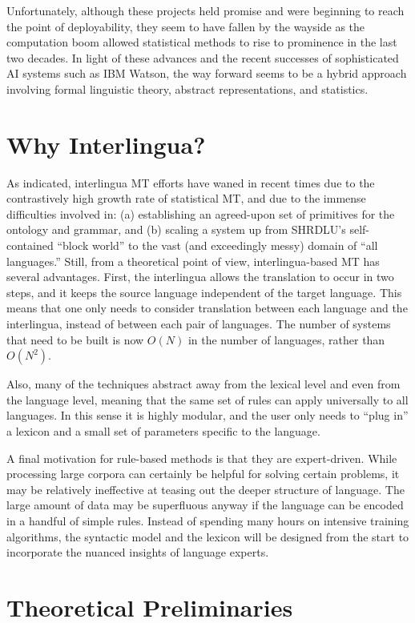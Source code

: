 \documentclass[11pt, oneside]{article}      %
\begin{document}
Unfortunately, although these projects held promise and were beginning to reach the point of deployability, they seem to have fallen by the wayside as the computation boom allowed statistical methods to rise to prominence in the last two decades.  In light of these advances and the recent successes of sophisticated AI systems such as IBM Watson, the way forward seems to be a hybrid approach involving formal linguistic theory, abstract representations, and statistics.

\section{Why Interlingua?}

As indicated, interlingua MT efforts have waned in recent times due to the contrastively high growth rate of statistical MT, and due to the immense difficulties involved in: (a) establishing an agreed-upon set of primitives for the ontology and grammar, and (b) scaling a system up from SHRDLU's self-contained ``block world'' to the vast (and exceedingly messy) domain of ``all languages.''  Still, from a theoretical point of view, interlingua-based MT has several advantages.  First, the interlingua allows the translation to occur in two steps, and it keeps the source language independent of the target language.  This means that one only needs to consider translation between each language and the interlingua, instead of between each pair of languages.  The number of systems that need to be built is now $O(N)$ in the number of languages, rather than $O(N^2)$.

Also, many of the techniques abstract away from the lexical level and even from the language level, meaning that the same set of rules can apply universally to all languages.  In this sense it is highly modular, and the user only needs to ``plug in'' a lexicon and a small set of parameters specific to the language.

A final motivation for rule-based methods is that they are expert-driven.  While processing large corpora can certainly be helpful for solving certain problems, it may be relatively ineffective at teasing out the deeper structure of language.  The large amount of data may be superfluous anyway if the language can be encoded in a handful of simple rules.  Instead of spending many hours on intensive training algorithms, the syntactic model and the lexicon will be designed from the start to incorporate the nuanced insights of language experts.  

\section{Theoretical Preliminaries}
\end{document}
